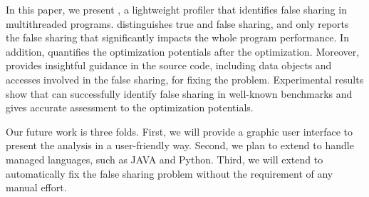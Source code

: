 \label{sec:conclusion}

In this paper, we present \cheetah{}, a lightweight profiler that identifies false sharing in multithreaded programs. \cheetah{} distinguishes true and false sharing, and only reports the false sharing that significantly impacts the whole program performance. In addition, \cheetah{} quantifies the optimization potentials after the optimization. Moreover, \cheetah{} provides insightful guidance in the source code, including data objects and accesses involved in the false sharing, for fixing the problem. Experimental results show that \cheetah{} can successfully identify false sharing in well-known benchmarks and gives accurate assessment to the optimization potentials.

Our future work is three folds. First, we will provide a graphic user interface to present the analysis in a user-friendly way. Second, we plan to extend \cheetah{} to handle managed languages, such as JAVA and Python. Third, we will extend \cheetah{} to automatically fix the false sharing problem without the requirement of any manual effort.